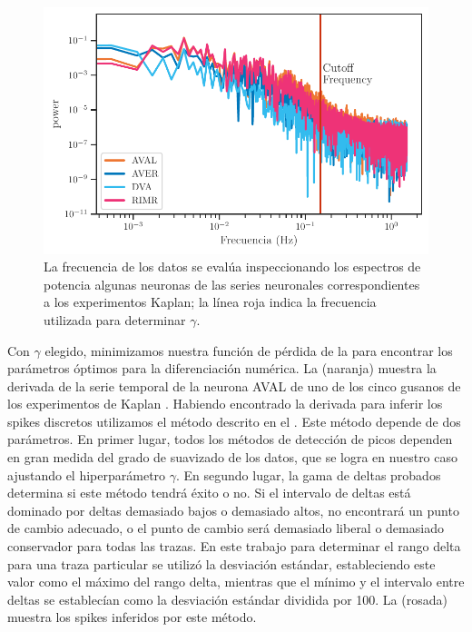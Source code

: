 \begin{figure}[h!]
	\centering{}\includegraphics[width=\imsize]{espectro_potencias_experimentos.pdf}
	\caption[La frecuencia de los datos se evalúa inspeccionando los espectros de potencia; la línea roja indica la frecuencia utilizada para determinar $\gamma$]{La frecuencia de los datos se evalúa inspeccionando los espectros de potencia algunas neuronas de las series neuronales correspondientes a  los experimentos  Kaplan; la línea roja indica la frecuencia utilizada para determinar $\gamma$. }\label{f:espectro_potencias_experimentos}  
\end{figure}

Con $\gamma$ elegido, minimizamos nuestra función de pérdida de la  para encontrar los parámetros óptimos para la diferenciación numérica. La (naranja)   muestra  la derivada   de la serie temporal de la neurona AVAL de uno de los cinco gusanos de los experimentos de Kaplan \cite{kaplan_nested_2020}.   Habiendo encontrado  la derivada para inferir los spikes discretos utilizamos el método descrito en el .   Este método depende de dos parámetros. En primer lugar, todos los métodos de detección de picos dependen en gran medida del grado de suavizado de los datos, que se logra en nuestro caso ajustando el hiperparámetro $\gamma$. En segundo lugar, la gama de deltas probados determina si este método tendrá éxito o no. Si el intervalo de deltas está dominado por deltas demasiado bajos o demasiado altos, no encontrará un punto de cambio adecuado, o el punto de cambio será demasiado liberal o demasiado conservador para todas las trazas. En este trabajo para determinar el rango delta  para una traza particular se utilizó la desviación estándar, estableciendo este valor como el máximo del rango delta, mientras que el mínimo y el intervalo entre deltas se establecían como la desviación estándar dividida por 100. La   (rosada) muestra los spikes inferidos por este método.




